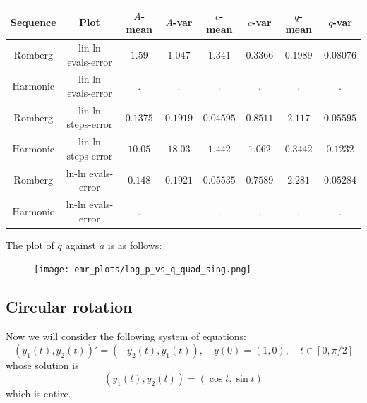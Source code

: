 \begin{table}[H]
    \centering
    \small
     \begin{tabular}{c|c||c|c|c|c|c|c}
Sequence & Plot & \(A\)-mean & \(A\)-var & \(c\)-mean & \(c\)-var & \(q\)-mean & \(q\)-var\\\hline
Romberg & lin-ln evals-error & \(1.59\) & \(1.047\) & \(1.341\) & \(0.3366\) & \(0.1989\) & \(0.08076\) \\
Harmonic & lin-ln evals-error & . & . & . & . & . & . \\
Romberg & lin-ln steps-error & \(0.1375\) & \(0.1919\) & \(0.04595\) & \(0.8511\) & \(2.117\) & \(0.05595\) \\
Harmonic & lin-ln steps-error & \(10.05\) & \(18.03\) & \(1.442\) & \(1.062\) & \(0.3442\) & \(0.1232\) \\
Romberg & ln-ln evals-error & \(0.148\) & \(0.1921\) & \(0.05535\) & \(0.7589\) & \(2.281\) & \(0.05284\) \\
Harmonic & ln-ln evals-error & . & . & . & . & . & . \\
    \end{tabular}
    \label{tab:my_label}
\end{table}

The plot of \(q\) against \(a\) is as follows:

\begin{figure}[H]
\centering
\begin{minipage}{0.45\textwidth}
\centering
\texttt{[image: emr\_plots/log\_p\_vs\_q\_quad\_sing.png]}
\end{minipage}
\end{figure}

\subsection{Circular rotation}

Now we will consider the following system of equations:
\begin{equation}\label{48}
(y_1(t),y_2(t))' = (-y_2(t), y_1(t)), \quad y(0) = (1,0), \quad t\in [0,\pi /2]
\end{equation}
whose solution is 
\[
(y_1(t),y_2(t)) = (\cos t, \sin t)
\]
which is entire.

